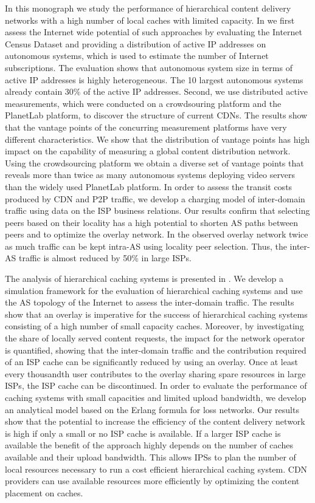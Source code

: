In this monograph we study the performance of hierarchical content delivery networks with a high number of local caches with limited capacity.
In  we first assess the Internet wide potential of such approaches by evaluating the Internet Census Dataset and providing a distribution of active IP addresses on autonomous systems, which is used to estimate the number of Internet subscriptions.
The evaluation shows that autonomous system size in terms of active IP addresses is highly heterogeneous.
The 10 largest autonomous systems already contain 30\% of the active IP addresses.
Second, we use distributed active measurements, which were conducted on a crowdsouring platform and the PlanetLab platform, to discover the structure of current CDNs.
The results show that the vantage points of the concurring measurement platforms have very different characteristics.
We show that the distribution of vantage points has high impact on the capability of measuring a global content distribution network.
Using the crowdsourcing platform we obtain a diverse set of vantage points that reveals more than twice as many autonomous systems deploying video servers than the widely used PlanetLab platform.
In order to assess the transit costs produced by CDN and P2P traffic, we develop a charging model of inter-domain traffic using data on the ISP business relations.
Our results confirm that selecting peers based on their locality has a high potential to shorten AS paths between peers and to optimize the overlay network. In the observed overlay network twice as much traffic can be kept intra-AS using locality peer selection.
Thus, the inter-AS traffic is almost reduced by 50\% in large ISPs.

The analysis of hierarchical caching systems is presented in .
We develop a simulation framework for the evaluation of hierarchical caching systems and use the AS topology of the Internet to assess the inter-domain traffic.
The results show that an overlay is imperative for the success of hierarchical caching systems consisting of a high number of small capacity caches.
Moreover, by investigating the share of locally served content requests, the impact for the network operator is quantified, showing that the inter-domain traffic and the contribution required of an ISP cache can be significantly reduced by using an overlay.
Once at least every thousandth user contributes to the overlay sharing spare resources in large ISPs, the ISP cache can be discontinued.
In order to evaluate the performance of caching systems with small capacities and limited upload bandwidth, we develop an analytical model based on the Erlang formula for loss networks.
Our results show that the potential to increase the efficiency of the content delivery network is high if only a small or no ISP cache is available.
If a larger ISP cache is available the benefit of the approach highly depends on the number of caches available and their upload bandwidth.
This allows IPSs to plan the number of local resources necessary to run a cost efficient hierarchical caching system.
CDN providers can use available resources more efficiently by optimizing the content placement on caches.

